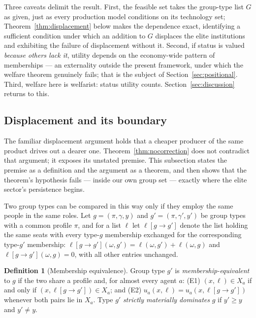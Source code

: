 \documentclass[12pt,letterpaper]{article}
\theoremstyle{definition}
\newtheorem{definition}{Definition}
\begin{document}
Three caveats delimit the result.
First, the feasible set takes the group-type list $G$ as given, just as every production model conditions on its technology set; Theorem~\ref{thm:displacement} below makes the dependence exact, identifying a sufficient condition under which an addition to $G$ displaces the elite institutions and exhibiting the failure of displacement without it.
Second, if status is valued \emph{because others lack it}, utility depends on the economy-wide pattern of memberships --- an externality outside the present framework, under which the welfare theorem genuinely fails; that is the subject of Section~\ref{sec:positional}.
Third, welfare here is welfarist: status utility counts.
Section~\ref{sec:discussion} returns to this.

\subsection{Displacement and its boundary}\label{sec:displacement}

The familiar displacement argument holds that a cheaper producer of the same product drives out a dearer one.
Theorem~\ref{thm:nocorrection} does not contradict that argument; it exposes its unstated premise.
This subsection states the premise as a definition and the argument as a theorem, and then shows that the theorem's hypothesis fails --- inside our own group set --- exactly where the elite sector's persistence begins.

Two group types can be compared in this way only if they employ the same people in the same roles.
Let $g=(\pi,\gamma,y)$ and $g'=(\pi,\gamma',y')$ be group types with a common profile $\pi$, and for a list $\ell$ let $\ell[g\rightarrow g']$ denote the list holding the same seats with every type-$g$ membership exchanged for the corresponding type-$g'$ membership: $\ell[g\rightarrow g'](\omega,g')=\ell(\omega,g')+\ell(\omega,g)$ and $\ell[g\rightarrow g'](\omega,g)=0$, with all other entries unchanged.

\begin{definition}[Membership equivalence]\label{def:equivalence}
Group type $g'$ is \emph{membership-equivalent} to $g$ if the two share a profile and, for almost every agent $a$:
(E1) $(x,\ell)\in X_a$ if and only if $(x,\ell[g\rightarrow g'])\in X_a$; and
(E2) $u_a(x,\ell)=u_a(x,\ell[g\rightarrow g'])$ whenever both pairs lie in $X_a$.
Type $g'$ \emph{strictly materially dominates} $g$ if $y'\geq y$ and $y'\neq y$.
\end{definition}
\end{document}
